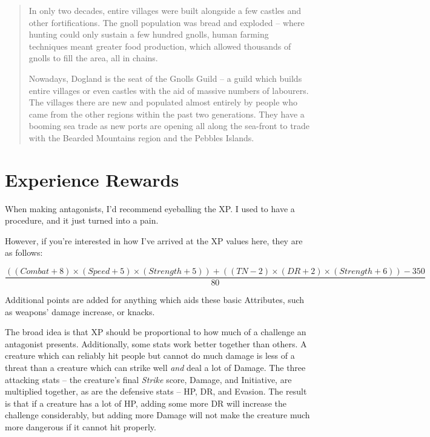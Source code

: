 \begin{quotation}
	In only two decades, entire villages were built alongside a few castles and other fortifications.  The gnoll population was bread and exploded -- where hunting could only sustain a few hundred gnolls, human farming techniques meant greater food production, which allowed thousands of gnolls to fill the area, all in chains.

	Nowadays, Dogland is the seat of the Gnolls Guild -- a guild which builds entire villages or even castles with the aid of massive numbers of labourers.  The villages there are new and populated almost entirely by people who came from the other regions within the past two generations.  They have a booming sea trade as new ports are opening all along the sea-front to trade with the Bearded Mountains region and the Pebbles Islands.
\end{quotation}

\chapter{Experience Rewards}

When making antagonists, I'd recommend eyeballing the XP.  I used to have a procedure, and it just turned into a pain.

However, if you're interested in how I've arrived at the XP values here, they are as follows:

\begin{equation}
\frac{(( Combat + 8 ) \times ( Speed + 5) \times ( Strength + 5 ) ) + ( ( TN -2 ) \times ( DR + 2 ) \times ( Strength + 6 )) - 350}{80}
\end{equation}

Additional points are added for anything which aids these basic Attributes, such as weapons' damage increase, or knacks.

\label{lastpage}The broad idea is that XP should be proportional to how much of a challenge an antagonist presents.  Additionally, some stats work better together than others.  A creature which can reliably hit people but cannot do much damage is less of a threat than a creature which can strike well \emph{and} deal a lot of Damage.  The three attacking stats -- the creature's final \textit{Strike} score, Damage, and Initiative, are multiplied together, as are the defensive stats -- HP, DR, and Evasion.  The result is that if a creature has a lot of HP, adding some more DR will increase the challenge considerably, but adding more Damage will not make the creature much more dangerous if it cannot hit properly.

